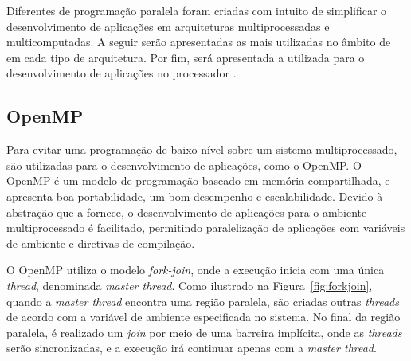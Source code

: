 Diferentes \apis de programação paralela foram criadas com intuito de simplificar
o desenvolvimento de aplicações em arquiteturas multiprocessadas e multicomputadas.
A seguir serão apresentadas as \apis mais utilizadas no âmbito de \hpc em cada tipo de
arquitetura. Por fim, será apresentada a \api utilizada para o desenvolvimento de aplicações
no processador \mppa.


\subsection{OpenMP}

%


Para evitar uma programação de baixo nível sobre um sistema multiprocessado, são
utilizadas \apis para o desenvolvimento de aplicações, como o OpenMP. O OpenMP
é um modelo de programação baseado em memória compartilhada, e apresenta boa
portabilidade, um bom desempenho e escalabilidade. Devido à abstração que a \api
fornece, o desenvolvimento de aplicações para o ambiente multiprocessado é
facilitado, permitindo paralelização de aplicações com variáveis de ambiente e
diretivas de compilação.

O OpenMP utiliza o modelo \textit{fork-join}, onde a execução inicia com uma
única \textit{thread}, denominada \textit{master thread}. Como ilustrado na
Figura~\ref{fig:forkjoin}, quando a \textit{master thread} encontra
uma região paralela, são criadas outras \textit{threads} de acordo com a variável
de ambiente especificada no sistema. No final da região paralela, é realizado um
\textit{join} por meio de uma barreira implícita, onde as \textit{threads} serão
sincronizadas, e a execução irá continuar apenas com a \textit{master thread}.

